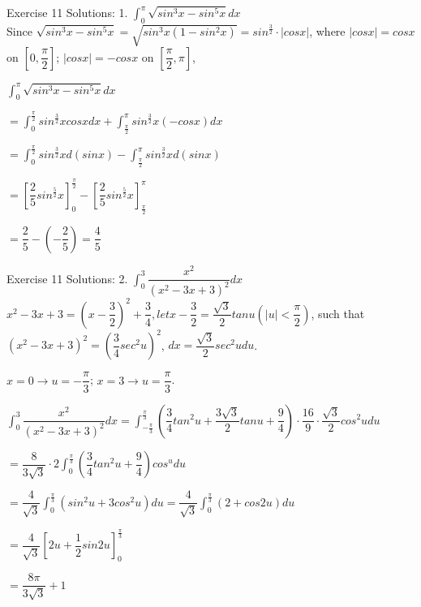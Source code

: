 \begin{frame}{Exercise 11}
    Solutions:
    1. $\int_{0}^{\pi}\sqrt{sin^3x - sin^5x}dx$
    \\

    Since $\sqrt{sin^3x - sin^5 x} = \sqrt{sin^3x(1-sin^2x)} = sin^{\frac{3}{2}}\cdot|cosx|$, where $|cosx| = cosx$ on $[0,\dfrac{\pi}{2}]$; $|cosx| = -cosx$ on $[\dfrac{\pi}{2}, \pi]$,

    $\int_{0}^{\pi}\sqrt{sin^3x - sin^5x}dx$

    $= \int_{0}^{\frac{\pi}{2}}sin^{\frac{3}{2}}xcosxdx + \int_{\frac{\pi}{2}}^{\pi}sin^{\frac{3}{2}}x(-cosx)dx$

    $= \int_{0}^{\frac{\pi}{2}}sin^{\frac{3}{2}}xd(sinx) - \int_{\frac{\pi}{2}}^{\pi}sin^{\frac{3}{2}}xd(sinx)$

    $= [\dfrac{2}{5}sin^{\frac{5}{2}}x]_0^{\frac{\pi}{2}} - [\dfrac{2}{5}sin^{\frac{5}{2}}x]_{\frac{\pi}{2}}^{\pi}$

    $= \dfrac{2}{5} - (-\dfrac{2}{5}) = \dfrac{4}{5}$
\end{frame}

\begin{frame}{Exercise 11}
    Solutions:
    2. $\int_{0}^{3}\dfrac{x^2}{(x^2 -3x +3)^2}dx$
    \\

    $x^2 - 3x +3 = (x - \dfrac{3}{2})^2 + \dfrac{3}{4}, let x - \dfrac{3}{2} = \dfrac{\sqrt{3}}{2}tanu (|u|<\dfrac{\pi}{2}) $, such that $(x^2 - 3x + 3)^2 = (\dfrac{3}{4}sec^2u)^2$, $dx = \dfrac{\sqrt{3}}{2}sec^2udu$.

    $x = 0 \rightarrow u = -\dfrac{\pi}{3}$; $x = 3 \rightarrow u = \dfrac{\pi}{3}$.

    $\int_{0}^{3}\dfrac{x^2}{(x^2 -3x +3)^2}dx = \int_{-\frac{\pi}{3}}^{\frac{\pi}{3}}(\dfrac{3}{4}tan^2u + \dfrac{3\sqrt{3}}{2}tanu + \dfrac{9}{4})\cdot \dfrac{16}{9}\cdot \dfrac{\sqrt{3}}{2}cos^2udu$

    $= \dfrac{8}{3\sqrt{3}}\cdot 2 \int_{0}^{\frac{\pi}{3}}(\dfrac{3}{4}tan^2u + \dfrac{9}{4})cos^u du$

    $= \dfrac{4}{\sqrt{3}}\int_{0}^{\frac{\pi}{3}}(sin^2u + 3cos^2 u)du = \dfrac{4}{\sqrt{3}}\int_{0}^{\frac{\pi}{3}}(2 + cos2u)du$

    $= \dfrac{4}{\sqrt{3}} [2u + \dfrac{1}{2}sin2u]_{0}^{\frac{\pi}{3}}$

    $= \dfrac{8\pi}{3\sqrt{3}} + 1$
\end{frame}

